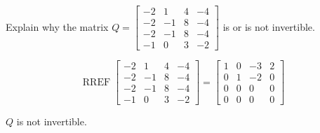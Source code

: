 
\begin{exerciseStatement}


Explain why the matrix \(Q= \left[\begin{array}{cccc}
-2 & 1 & 4 & -4 \\
-2 & -1 & 8 & -4 \\
-2 & -1 & 8 & -4 \\
-1 & 0 & 3 & -2
\end{array}\right] \) is or is not invertible.


\end{exerciseStatement}
    
\begin{exerciseAnswer} 


\[\operatorname{RREF} \left[\begin{array}{cccc}
-2 & 1 & 4 & -4 \\
-2 & -1 & 8 & -4 \\
-2 & -1 & 8 & -4 \\
-1 & 0 & 3 & -2
\end{array}\right] = \left[\begin{array}{cccc}
1 & 0 & -3 & 2 \\
0 & 1 & -2 & 0 \\
0 & 0 & 0 & 0 \\
0 & 0 & 0 & 0
\end{array}\right] \]

\(Q\) is not invertible.
\end{exerciseAnswer}
    
